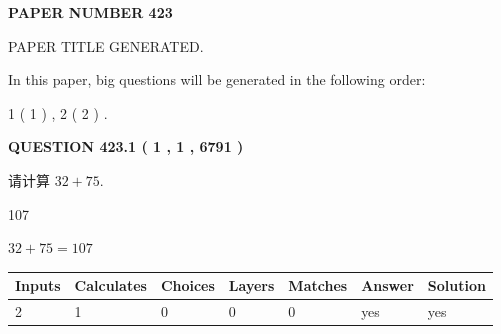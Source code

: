\documentclass{ctexart}
\begin{document}
   
 {\textbf{ \Large{ PAPER NUMBER  423  }}}
   
   
\vspace{0.2in}
   
   
   
   
   
   
   
   
 \vspace{0.2in}
 
 
 
 
   
   
 PAPER TITLE GENERATED.
   
   
   
\vspace{0.2in}
   
In this paper, big questions will be generated in the following order: 
   
   
   1 ( 1 )
 ,
   2 ( 2 )
 .
  
\vspace{0.2in}
  
{\textbf{\Large{QUESTION
423.1 
 ( 1 , 1 , 6791 )
}}}
  
  
 
请计算 $ %
32 +  %
75 $.
 
 
 
\noindent{}
 
 

107
 
 
\noindent{}
 
 

 
 
 
\noindent{}
 
 

$ %
32 +  %
75=   %
107$
 
 
\noindent{}
 
 

 
   
   
   
   
\noindent\begin{tabular}{|l|l|l|l|l|l|l|}
 \hline
Inputs & Calculates & Choices & Layers & Matches & Answer & Solution \\ \hline
 2  & 
 1  & 
 0
  & 
 0  & 
 0  & 
  yes & 
  yes 
  \\ \hline
 \end{tabular}
   
\end{document}
